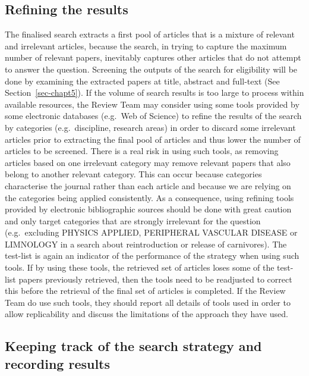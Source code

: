 \documentclass[
  letterpaper,
  DIV=11,
  numbers=noendperiod]{scrreprt}
\begin{document}
\subsection{Refining the results}\label{refining-the-results}

The finalised search extracts a first pool of articles that is a mixture
of relevant and irrelevant articles, because the search, in trying to
capture the maximum number of relevant papers, inevitably captures other
articles that do not attempt to answer the question. Screening the
outputs of the search for eligibility will be done by examining the
extracted papers at title, abstract and full-text (See
Section~\ref{sec-chapt5}). If the volume of search results is too large
to process within available resources, the Review Team may consider
using some tools provided by some electronic databases (e.g.~Web of
Science) to refine the results of the search by categories
(e.g.~discipline, research areas) in order to discard some irrelevant
articles prior to extracting the final pool of articles and thus lower
the number of articles to be screened. There is a real risk in using
such tools, as removing articles based on one irrelevant category may
remove relevant papers that also belong to another relevant category.
This can occur because categories characterise the journal rather than
each article and because we are relying on the categories being applied
consistently. As a consequence, using refining tools provided by
electronic bibliographic sources should be done with great caution and
only target categories that are strongly irrelevant for the question
(e.g.~excluding PHYSICS APPLIED, PERIPHERAL VASCULAR DISEASE or
LIMNOLOGY in a search about reintroduction or release of carnivores).
The test-list is again an indicator of the performance of the strategy
when using such tools. If by using these tools, the retrieved set of
articles loses some of the test-list papers previously retrieved, then
the tools need to be readjusted to correct this before the retrieval of
the final set of articles is completed. If the Review Team do use such
tools, they should report all details of tools used in order to allow
replicability and discuss the limitations of the approach they have
used.

\subsection{Keeping track of the search strategy and recording
results}\label{keeping-track-of-the-search-strategy-and-recording-results}
\end{document}
